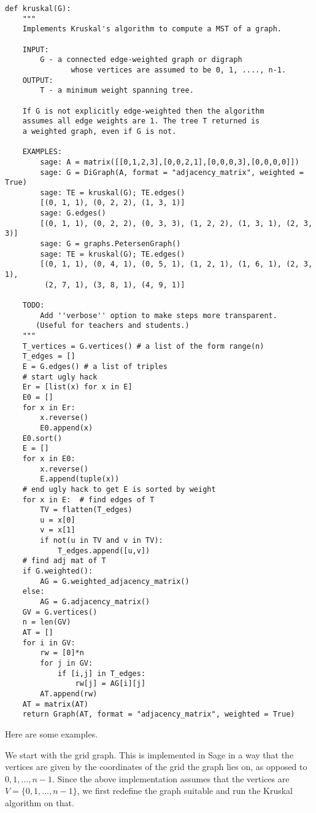 \begin{lstlisting}
def kruskal(G):
    """
    Implements Kruskal's algorithm to compute a MST of a graph.

    INPUT:
        G - a connected edge-weighted graph or digraph
               whose vertices are assumed to be 0, 1, ...., n-1.
    OUTPUT:
        T - a minimum weight spanning tree.

    If G is not explicitly edge-weighted then the algorithm
    assumes all edge weights are 1. The tree T returned is
    a weighted graph, even if G is not.

    EXAMPLES:
        sage: A = matrix([[0,1,2,3],[0,0,2,1],[0,0,0,3],[0,0,0,0]])
        sage: G = DiGraph(A, format = "adjacency_matrix", weighted = True)
        sage: TE = kruskal(G); TE.edges()
        [(0, 1, 1), (0, 2, 2), (1, 3, 1)]
        sage: G.edges()
        [(0, 1, 1), (0, 2, 2), (0, 3, 3), (1, 2, 2), (1, 3, 1), (2, 3, 3)]
        sage: G = graphs.PetersenGraph()
        sage: TE = kruskal(G); TE.edges()
        [(0, 1, 1), (0, 4, 1), (0, 5, 1), (1, 2, 1), (1, 6, 1), (2, 3, 1),
         (2, 7, 1), (3, 8, 1), (4, 9, 1)]

    TODO:
        Add ''verbose'' option to make steps more transparent.
       (Useful for teachers and students.)
    """
    T_vertices = G.vertices() # a list of the form range(n)
    T_edges = []
    E = G.edges() # a list of triples
    # start ugly hack
    Er = [list(x) for x in E]
    E0 = []
    for x in Er:
        x.reverse()
        E0.append(x)
    E0.sort()
    E = []
    for x in E0:
        x.reverse()
        E.append(tuple(x))
    # end ugly hack to get E is sorted by weight
    for x in E:  # find edges of T
        TV = flatten(T_edges)
        u = x[0]
        v = x[1]
        if not(u in TV and v in TV):
            T_edges.append([u,v])
    # find adj mat of T
    if G.weighted():
        AG = G.weighted_adjacency_matrix()
    else:
        AG = G.adjacency_matrix()
    GV = G.vertices()
    n = len(GV)
    AT = []
    for i in GV:
        rw = [0]*n
        for j in GV:
            if [i,j] in T_edges:
                rw[j] = AG[i][j]
        AT.append(rw)
    AT = matrix(AT)
    return Graph(AT, format = "adjacency_matrix", weighted = True)
\end{lstlisting}

Here are some examples.

We start with the grid graph. This is implemented in Sage
in a way that the vertices are given by the coordinates of the
grid the graph lies on, as opposed to $0,1,\dots,n-1$.
Since the above implementation assumes that the
vertices are $V=\{0,1,\dots,n-1\}$, we first redefine
the graph suitable and run the Kruskal algorithm on that.

